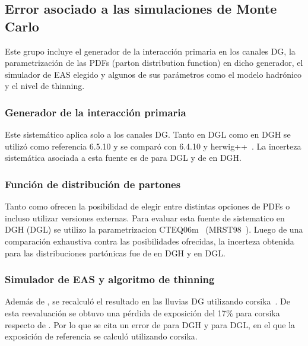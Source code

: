 	\subsection{Error asociado a las simulaciones de Monte Carlo}
	
	Este grupo incluye el generador de la interacción primaria en los canales DG, la parametrización de las PDFs (parton distribution function) en dicho generador, el simulador de EAS elegido y algunos de sus parámetros como el modelo hadrónico y el nivel de thinning.
	
		\subsubsection{Generador de la interacción primaria}
		
		Este sistemático aplica solo a los canales DG.
		Tanto en DGL como en DGH se utilizó como referencia \herwig{} 6.5.10 \cite{cite:herwig} y se comparó con \pythia{} 6.4.10\cite{cite:PYTHIA} y {\sc herwig++}~\cite{cite:Herwig++}.
		La incerteza sistemática asociada a esta fuente es de  para DGL y de  en DGH.
		
		\subsubsection{Función de distribución de partones}
		
		Tanto \herwig{} como \pythia{} ofrecen la posibilidad de elegir entre distintas opciones de PDFs o incluso utilizar versiones externas. Para evaluar esta fuente de sistematico en DGH (DGL) se utilizo la parametrizacion CTEQ06m~\cite{CTEQ06m} (MRST98~\cite{MRST98}).
		Luego de una comparación exhaustiva contra las posibilidades ofrecidas, la incerteza obtenida para las distribuciones partónicas fue de  en DGH y  en DGL.
		
		\subsubsection{Simulador de EAS y algoritmo de thinning}
		
		Además de \aires{}, se recalculó el resultado en las lluvias DG utilizando {\sc corsika}~\cite{cite:corsika}.
		De esta reevaluación se obtuvo una pérdida de exposición del 17$\%$ para {\sc corsika} respecto de \aires{}.
		Por lo que se cita un error de  para DGH y  para DGL, en el que la exposición de referencia se calculó utilizando {\sc corsika}.
		
